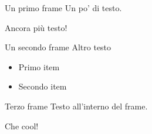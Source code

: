 \documentclass{beamer}
\begin{document}
\begin{frame}{Un primo frame}
    Un po' di testo.

    Ancora più testo!
\end{frame}

\begin{frame}{Un secondo frame}
    Altro testo
    \begin{itemize}
        \item Primo item
        \item Secondo item
    \end{itemize}
\end{frame}

\begin{frame}{Terzo frame}
    Testo all'interno del frame. 
    
    \bigbreak

    Che cool!
\end{frame}
\end{document}
